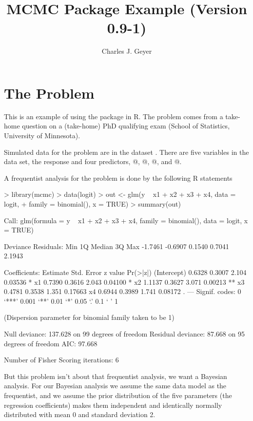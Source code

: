 \documentclass{article}
\begin{document}
\title{MCMC Package Example (Version 0.9-1)}
\author{Charles J. Geyer}
\maketitle

\section{The Problem}

This is an example of using the \verb@mcmc@ package in R.  The problem comes
from a take-home question on a (take-home) PhD qualifying exam
(School of Statistics, University of Minnesota).

Simulated data for the problem are in the dataset \verb@logit@.
There are five variables in the data set, the response \verb@y@
and four predictors, @, @, @, and @.

A frequentist analysis for the problem is done by the following R statements
\begin{Schunk}
\begin{Sinput}
> library(mcmc)
> data(logit)
> out <- glm(y ~ x1 + x2 + x3 + x4, data = logit,
+     family = binomial(), x = TRUE)
> summary(out)
\end{Sinput}
\begin{Soutput}
Call:
glm(formula = y ~ x1 + x2 + x3 + x4, family = binomial(), data = logit, 
    x = TRUE)

Deviance Residuals: 
    Min       1Q   Median       3Q      Max  
-1.7461  -0.6907   0.1540   0.7041   2.1943  

Coefficients:
            Estimate Std. Error z value Pr(>|z|)   
(Intercept)   0.6328     0.3007   2.104  0.03536 * 
x1            0.7390     0.3616   2.043  0.04100 * 
x2            1.1137     0.3627   3.071  0.00213 **
x3            0.4781     0.3538   1.351  0.17663   
x4            0.6944     0.3989   1.741  0.08172 . 
---
Signif. codes:  0 ‘***’ 0.001 ‘**’ 0.01 ‘*’ 0.05 ‘.’ 0.1 ‘ ’ 1 

(Dispersion parameter for binomial family taken to be 1)

    Null deviance: 137.628  on 99  degrees of freedom
Residual deviance:  87.668  on 95  degrees of freedom
AIC: 97.668

Number of Fisher Scoring iterations: 6
\end{Soutput}
\end{Schunk}

But this problem isn't about that frequentist analysis, we want a Bayesian
analysis.  For our Bayesian analysis we assume the same data model as the
frequentist, and we assume the prior distribution of the five parameters
(the regression coefficients) makes them independent and identically
normally distributed with mean 0 and standard deviation 2.
\end{document}
